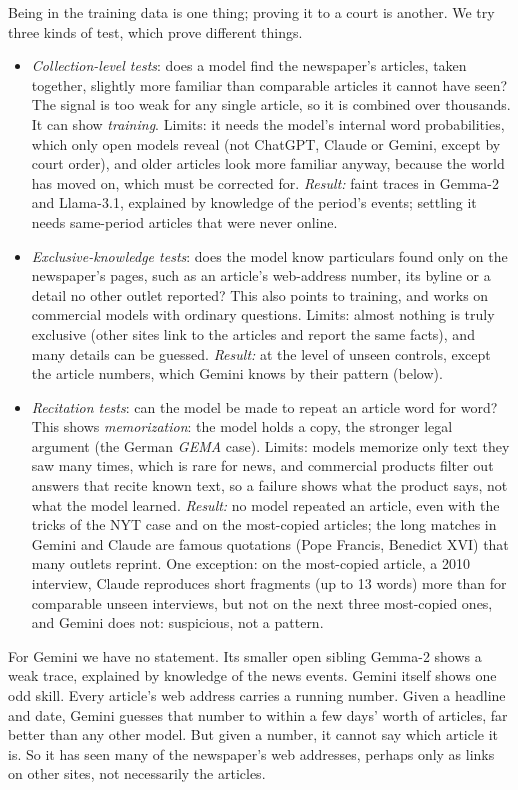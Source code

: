 \documentclass[10pt,a4paper]{article}
\begin{document}
Being in the training data is one thing; proving it to a court is another. We try three kinds of test, which
prove different things.
\begin{itemize}
\item \emph{Collection-level tests}: does a model find the newspaper's articles, taken together, slightly more familiar
than comparable articles it cannot have seen? The signal is too weak for any single article, so it is combined over
thousands. It can show \emph{training}. Limits: it needs the model's internal word probabilities, which only open
models reveal (not ChatGPT, Claude or Gemini, except by court order), and older articles look more familiar anyway,
because the world has moved on, which must be corrected for. \emph{Result:} faint traces in Gemma-2 and Llama-3.1,
explained by knowledge of the period's events; settling it needs same-period articles that were never online.
\item \emph{Exclusive-knowledge tests}: does the model know particulars found only on the newspaper's pages, such as an
article's web-address number, its byline or a detail no other outlet reported? This also points to training, and works
on commercial models with ordinary questions. Limits: almost nothing is truly exclusive (other sites link to the
articles and report the same facts), and many details can be guessed. \emph{Result:} at the level of unseen controls,
except the article numbers, which Gemini knows by their pattern (below).
\item \emph{Recitation tests}: can the model be made to repeat an article word for word? This shows \emph{memorization}:
the model holds a copy, the stronger legal argument (the German \emph{GEMA} case). Limits: models memorize only text
they saw many times, which is rare for news, and commercial products filter out answers that recite known text, so a
failure shows what the product says, not what the model learned. \emph{Result:} no model repeated an article, even
with the tricks of the NYT case and on the most-copied articles; the long matches in Gemini and Claude are famous
quotations (Pope Francis, Benedict XVI) that many outlets reprint. One exception: on the most-copied
article, a 2010 interview, Claude reproduces short fragments (up to 13 words) more than for comparable unseen
interviews, but not on the next three most-copied ones, and Gemini does not: suspicious, not a pattern.
\end{itemize}

For Gemini we have no statement. Its smaller open sibling Gemma-2 shows a weak trace, explained by
knowledge of the news events. Gemini itself shows one odd skill. Every article's web address carries a running
number. Given a headline and date, Gemini guesses that number to within a few days' worth of articles, far better
than any other model. But given a number, it cannot say which article it is. So it has seen many of the newspaper's
web addresses, perhaps only as links on other sites, not necessarily the articles.
\end{document}
